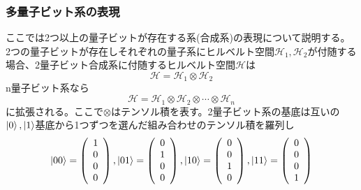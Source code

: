         \subsubsection{多量子ビット系の表現}
        ここでは2つ以上の量子ビットが存在する系(合成系)の表現について説明する。\\
        2つの量子ビットが存在しそれぞれの量子系にヒルベルト空間$\mathcal{H}_1,\mathcal{H}_2$が付随する場合、2量子ビット合成系に付随するヒルベルト空間$\mathcal{H}$は
        \begin{equation}
            \mathcal{H}=\mathcal{H}_1\otimes\mathcal{H}_2
        \end{equation}
        n量子ビット系なら
        \begin{equation}
            \mathcal{H}=\mathcal{H}_1\otimes\mathcal{H}_2\otimes\cdots\otimes\mathcal{H}_n
        \end{equation}
        に拡張される。ここで$\otimes$はテンソル積を表す。2量子ビット系の基底は互いの{$\ket{0},\ket{1}$}基底から1つずつを選んだ組み合わせのテンソル積を羅列し
        \begin{equation*}
            \ket{00}
            =\left(
                \begin{array}{c}
                    1 \\
                    0 \\
                    0 \\
                    0
                \end{array}
             \right),
            \ket{01}=\left(
                \begin{array}{c}
                    0 \\
                    1 \\
                    0 \\
                    0
                \end{array}
              \right),
            \ket{10}=\left(
                \begin{array}{c}
                    0 \\
                    0 \\
                    1 \\
                    0
                \end{array}
              \right),
            \ket{11}=\left(
                \begin{array}{c}
                    0 \\
                    0 \\
                    0 \\
                    1
                \end{array}
              \right)
        \end{equation*}
